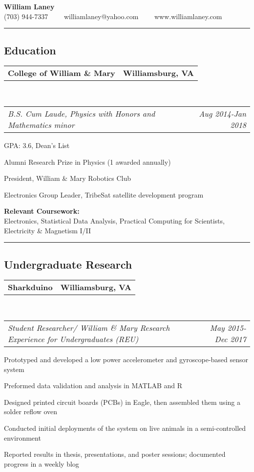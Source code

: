 \documentclass[10pt,letterpaper]{article}
\makeatletter
\newcommand{\headerrow}[2]
{\begin{tabular*}{\linewidth}{l@{\extracolsep{\fill}}r}
	#1 &
	#2 \\
\end{tabular*}}
\makeatother
\begin{document}
\begin{center}
{\LARGE \textbf{William Laney}}\\
\vspace{0.1em}
(703) 944-7337\ \ \textbullet
\ \ williamlaney@yahoo.com\ \ \textbullet
\ \ www.williamlaney.com
\end{center}

\hrule
\vspace{-0.4em}
\subsection*{Education}

	\headerrow
		{\textbf{College of William \& Mary}}
		{\textbf{Williamsburg, VA}}
	\\
	\headerrow
		{\emph{B.S. Cum Laude, Physics with Honors and Mathematics minor}}
		{\emph{Aug 2014-Jan 2018}}
	\begin{itemize*}
		\item GPA: 3.6, Dean's List
		\item Alumni Research Prize in Physics (1 awarded annually)
		\item President, William \& Mary Robotics Club
		\item Electronics Group Leader, TribeSat satellite development program
		\item \textbf{Relevant Coursework:} \\
		Electronics, Statistical Data Analysis, Practical Computing for Scientists, Electricity \& Magnetism I/II
	\end{itemize*}

\hrule
\vspace{-0.4em}
\subsection*{Undergraduate Research}

	\headerrow
		{\textbf{Sharkduino}}
		{\textbf{Williamsburg, VA}}
	\\
	\headerrow
		{\emph{Student Researcher/ William \& Mary Research Experience for Undergraduates (REU)}}
		{\emph{May 2015-Dec 2017}}
	\begin{itemize*}
	\item Prototyped and developed a low power accelerometer and gyroscope-based sensor system
	\item Preformed data validation and analysis in MATLAB and R
	\item Designed printed circuit boards (PCBs) in Eagle, then assembled them using a solder reflow oven
	\item Conducted initial deployments of the system on live animals in a semi-controlled environment
	\item Reported results in thesis, presentations, and poster sessions; documented progress in a weekly blog
	\end{itemize*}
	
\end{document}
